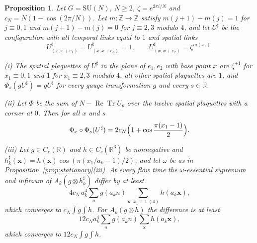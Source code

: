 \documentclass[aps,prd,twocolumn,superscriptaddress,nofootinbib,longbibliography,floatfix,amsmath,amssymb,10pt]{revtex4-2}
\newtheorem{proposition}[theorem]{Proposition}
\theoremstyle{definition}
\theoremstyle{remark}
\newcommand{\R}{\mathbb{R}}
\newcommand{\Z}{\mathbb{Z}}
\newcommand{\SU}{\mathrm{SU}}
\newcommand{\ReTr}{\operatorname{Re}\operatorname{Tr}}
\begin{document}
\begin{proposition}\label{prop:centralpattern}
Let $G=\SU(N)$, $N\ge2$, $\zeta=e^{2\pi i/N}$ and $c_N=N(1-\cos(2\pi/N))$.
Let $m:\Z\to\Z$ satisfy $m(j+1)-m(j)=1$ for $j\equiv0,1$ and
$m(j+1)-m(j)=0$ for $j\equiv2,3$ modulo $4$, and let $U^\sharp$ be the
configuration with all temporal links equal to $1$ and spatial links
\[
U^\sharp_{(x,x+e_1)}=U^\sharp_{(x,x+e_3)}=1,\qquad
U^\sharp_{(x,x+e_2)}=\zeta^{m(x_1)} .
\]

\textup{(i)} The spatial plaquettes of $U^\sharp$ in the plane of $e_1,e_2$
with base point $x$ are $\zeta^{\pm1}$ for $x_1\equiv0,1$ and $1$ for
$x_1\equiv2,3$ modulo $4$, all other spatial plaquettes are $1$, and
$\Phi_s(gU^\sharp)=gU^\sharp$ for every gauge transformation $g$ and every
$s\in\R$.

\textup{(ii)} Let $\Phi$ be the sum of $N-\ReTr U_p$ over the twelve spatial
plaquettes with a corner at $0$. Then for all $x$ and $s$
\[
\Phi_x\circ\Phi_s(U^\sharp)=2c_N\Bigl(1+\cos\frac{\pi(x_1-1)}2\Bigr).
\]

\textup{(iii)} Let $g\in C_c(\R)$ and $h\in C_c(\R^3)$ be nonnegative and
$h^\sharp_k(\mathbf x)=h(\mathbf x)\cos(\pi(x_1/a_k-1)/2)$, and let
$\omega$ be as in Proposition~\textup{\ref{prop:stationary}(iii)}. At every
flow time the $\omega$-essential supremum and infimum of $A_k(g\otimes
h^\sharp_k)$ differ by at least
\[
4c_N\,a_k^4\sum_ng(a_kn)\!\!\sum_{\mathbf x:\,x_1\equiv1\ (4)}\!\!h(a_k
\mathbf x) ,
\]
which converges to $c_N\int g\int h$. For $A_k(g\otimes h)$ the
difference is at least
\[
12c_Na_k^4\sum_ng(a_kn)\sum_{\mathbf x}h(a_k\mathbf x) ,
\]
which converges to $12c_N\int g\int h$.
\end{proposition}
\end{document}
